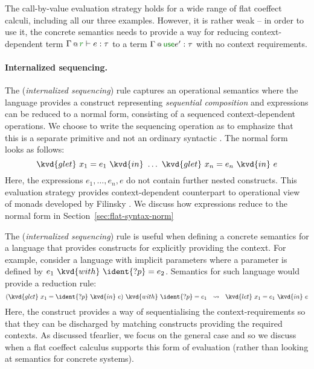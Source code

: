 The call-by-value evaluation strategy holds for a wide range of flat coeffect calculi, including all
our three examples. However, it is rather weak -- in order to use it, the concrete semantics needs
to provide a way for reducing context-dependent term $\coctx{\Gamma}{\cclrd{r}} \vdash e : \tau$ to
a term $\coctx{\Gamma}{\cunit} e' : \tau$ with no context requirements. 

\paragraph{Internalized sequencing.}

The (\emph{internalized sequencing}) rule captures an operational semantics where the language
provides a construct representing \emph{sequential composition} and expressions can be reduced to 
a normal form, consisting of a sequenced context-dependent operations. We choose to write the 
sequencing operation as  to emphasize that this is a separate primitive and not an 
ordinary syntactic . The normal form looks as follows:
%
\begin{equation*}
\kvd{glet}~x_1 = e_1~\kvd{in}~\ldots~\kvd{glet}~x_n = e_n~\kvd{in}~e
\end{equation*}
%
Here, the expressions $e_1, \ldots, e_n, e$ do not contain further nested  constructs.
This evaluation strategy provides context-dependent counterpart to operational view of monads
developed by Filinsky \cite{monads-inaction}. We discuss how expressions reduce to the normal form
in Section~\ref{sec:flat-syntax-norm}

The (\emph{internalized sequencing}) rule is useful when defining a concrete semantics for 
a language that provides constructs for explicitly providing the context. For example, consider
a language with implicit parameters where a parameter is defined by $e_1~\kvd{with}~\ident{?p}=e_2$.
Semantics for such language would provide a reduction rule:
%
\begin{equation*}
(\kvd{glet}~x_1 = \ident{?p}~\kvd{in}~e)~\kvd{with}~\ident{?p}=e_1 ~~\leadsto~~ \kvd{let}~x_1 = e_1~\kvd{in}~e
\end{equation*}
%
Here, the  construct provides a way of sequentialising the context-requi\-rements so
that they can be discharged by matching constructs providing the required contexts. As discussed
tfearlier, we focus on the general case and so we discuss when a flat coeffect calculus supports
this form of evaluation (rather than looking at semantics for concrete systems).

